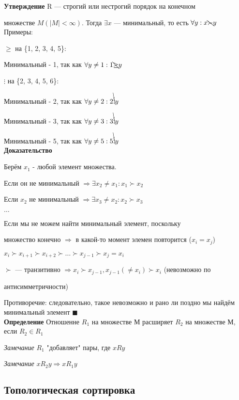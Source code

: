 \documentclass[a4paper, 12pt] {article}
\begin{document}
	
	\textbf{Утверждение}
	R --- строгий или нестрогий порядок на конечном 
	
	множестве $M (|M| < \infty)$. Тогда $\exists x$ --- минимальный, то есть $\forall y: x \bcancel \succ y$\\
	
	
	Примеры:
	
	$\ge$ на  \{1, 2, 3, 4, 5\}: 
	
	Минимальный - 1, так как $\forall y \ne 1: 1 \bcancel \ge y$
	
	$\vdots$ на  \{2, 3, 4, 5, 6\}: 
	
	Минимальный - 2, так как $\forall y \ne 2: 2 \bcancel \vdots y$
	
	Минимальный - 3, так как $\forall y \ne 3: 3 \bcancel \vdots y$
	
	Минимальный - 5, так как $\forall y \ne 5: 5 \bcancel \vdots y$\\
	
	
	\textbf{Доказательство}
	
	Берём $x_{1}$ - любой элемент множества. 
	
	Если он не минимальный $ \Rightarrow \exists x_{2} \ne x_{1}: x_{1} \succ x_{2}$
	
	Если $x_{2}$ не минимальный $ \Rightarrow \exists x_{3} \ne x_{2}: x_{2} \succ x_{3}$
	
	$\dots$
	
	Если мы не можем найти минимальный элемент, поскольку 
	
	множество конечно $ \Rightarrow $ в какой-то момент элемен повторится ($x_{i}=x_{j}$)
	
	$x_{i} \succ x_{i+1} \succ x_{i+2} \succ \dots \succ x_{j-1} \succ x_{j}= x_{i}$
	
	$\succ$ --- транзитивно $\Rightarrow x_{i} \succ x_{j-1}, x_{j-1} (\ne x_{i}) \succ x_{i}$ (невозможно по 
	
	антисимметричности) 
	
	Противоречие: следовательно, такое невозможно и рано ли поздно мы найдём минимальный элемент $\blacksquare$\\
	
	
	\textbf{Определение}
	Отношенне $R_{1}$ на множестве М расширяет $R_{2}$ на множестве М, если $R_{2} \in R_{1}$
	
	\textit{Замечание}
	$R_{1}$ "добавляет"$  $ пары, где $xRy$
	
	\textit{Замечание}
	$xR_{2}y \Rightarrow xR_{1}y$\\
	
	\subsection{Топологическая сортировка}
	
\end{document}
